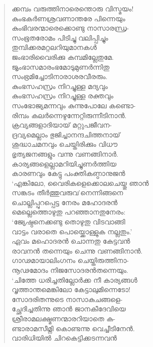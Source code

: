 \begin{verse}
ക്കമ്പം വരുത്തിനാരെന്തൊരു വിസ്മയം!\\
കുംഭകര്‍ണശ്രവണാന്തരേ പിന്നെയും\\
കുംഭിവരന്മാരെക്കൊണ്ടു നാസാരന്ധ്ര-\\
സംഭൂതരോമം പിടിച്ചു വലിപ്പിച്ചും\\
തുമ്പിക്കരമറ്റലറിയുമാനകള്‍\\
ജംഭാരിവൈരിക്കു കമ്പമില്ലേതുമേ.\\
ജൃംഭാസമാരംഭമോടുമുണര്‍ന്നിതു\\
സംഭ്രമിച്ചോടിനാരാശരവീരരും.\\
കുംഭസഹസ്രം നിറച്ചുള്ള മദ്യവും\\
കുംഭസഹസ്രം നിറച്ചുള്ള രക്തവും\\
സംഭോജ്യമന്നവും കുന്നുപോലേ കണ്ടൊ-\\
രിമ്പം കലര്‍ന്നെഴുന്നേറ്റിരുന്നീടിനാന്‍.\\
ക്രവ്യങ്ങളാദിയായ് മറ്റുപജീവന-\\
ദ്രവ്യമെല്ലാം ഭുജിച്ചാനന്ദചിത്തനായ്\\
ശുദ്ധാചമനവും ചെയ്തിരിക്കും വിധൗ\\
ഭൃത്യജനങ്ങളും വന്നു വണങ്ങിനാര്‍.\\
കാര്യങ്ങളെല്ലാമറിയിച്ചുണര്‍ത്തിയ\\
കാരണവും കേട്ടു പംക്തികണ്ഠാനുജന്‍\\
‘എങ്കിലോ, വൈരികളെക്കൊലചെയ്തു ഞാന്‍\\
സങ്കടം തീര്‍ത്തുവരുവ’നെന്നിങ്ങനെ\\
ചൊല്ലിപ്പുറപ്പെട്ട നേരം മഹോദരന്‍\\
മെല്ലെത്തൊഴുതു പറഞ്ഞാനതുനേരം:\\
‘ജ്യേഷ്ഠനെക്കണ്ടു തൊഴുതു വിടവാങ്ങി\\
വാട്ടം വരാതെ പൊയ്ക്കൊള്ളുക നല്ലതും.’\\
ഏവം മഹൊദരന്‍ ചൊന്നതു കേട്ടവന്‍\\
രാവനന്‍ തന്നെയും ചെന്നു വണങ്ങിനാന്‍.\\
ഗാഢമായാലിംഗനം ചെയ്തിരുത്തിനാ-\\
നൂഢമോദം നിജസോദരന്‍തന്നെയും.\\
‘ചിത്തേ ധരിച്ചതില്ലോര്‍ക്ക നീ കാര്യങ്ങള്‍\\
വൃത്താന്തമെങ്കിലോ കേട്ടാലുമിന്നെടോ!\\
സോദരിതന്നുടെ നാസാകുചങ്ങളെ-\\
ച്ഛേദിച്ചതിന്നു ഞാന്‍ ജാനകീദേവിയെ\\
ശ്രീരാമലക്ഷ്മണന്മാരറിയാതെ ക-\\
ണ്ടാരാമസീമ്നി കൊണ്ടന്നു വെച്ചീടിനേന്‍.\\
വാരിധിയില്‍ ചിറകെട്ടിക്കടന്നവന്‍\\

\end{verse}
